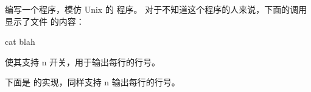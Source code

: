 \begin{Exercise}[title={Cat},difficulty=6]
\label{ex:cat}
\Question \label{ex:cat q1} 编写一个程序，模仿 Unix 的  程序。
对于不知道这个程序的人来说，下面的调用显示了文件  的内容：
\begin{display}
\pr cat blah
\end{display}

\Question 使其支持 \-n 开关，用于输出每行的行号。

\end{Exercise}

\begin{Answer}
\Question 下面是  的实现，同样支持 \-n 输出每行的行号。

\showremarks
\end{Answer}
